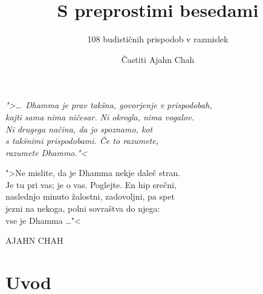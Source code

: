 \documentclass[11pt,twoside,final]{memoir}
\title{S preprostimi besedami}
\subtitle{108 budističnih prispodob v razmislek}
\author{Častiti Ajahn Chah}
\date{}
\begin{document}
\thispagestyle{empty}
\mbox{}
\clearpage

\thispagestyle{empty}
\mbox{}
\clearpage


\frontmatter*

\thispagestyle{empty}



\cleartoverso
\thispagestyle{empty}



\clearpage
\thispagestyle{empty}

\begin{quotepage}{\linewidth}
\centering \itshape
">\ldots{} Dhamma je prav takšna, govorjenje v prispodobah,\\
kajti sama nima ničesar. Ni okrogla, nima vogalov.\\
Ni drugega načina, da jo spoznamo, kot\\
s takšnimi prispodobami. Če to razumete,\\
razumete Dhammo."<

">Ne mislite, da je Dhamma nekje daleč stran.\\
Je tu pri vas; je o vas. Poglejte. En hip srečni,\\
naslednjo minuto žalostni, zadovoljni, pa spet\\
jezni na nekoga, polni sovraštva do njega:\\
vse je Dhamma \ldots{}"<

{\upshape AJAHN CHAH}
\end{quotepage}

\clearpage
\thispagestyle{empty}



\cleartorecto
\tableofcontents*



\chapter{Uvod}

\end{document}
